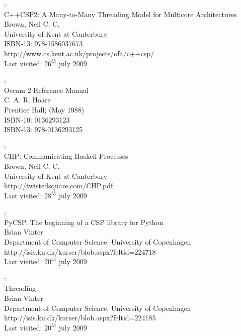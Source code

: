 \documentclass[a4paper,12pt]{article}
\begin{document}
\begin{thebibliography}{99}
:\\
C++CSP2: A Many-to-Many Threading Model for Multicore Architectures\\
Brown,  Neil C. C.\\
University of Kent at Canterbury\\
ISBN-13: 978-1586037673\\
http://www.cs.kent.ac.uk/projects/ofa/c++csp/\\
Last visited: $26^{th}$ july 2009

\newpage
{}
:\\
Occam 2 Reference Manual\\
C. A. R. Hoare\\
Prentice Hall; (May 1988)\\
ISBN-10: 0136293123\\
ISBN-13: 978-0136293125

:\\
CHP: Communicating Haskell Processes\\
Brown,  Neil C. C.\\
University of Kent at Canterbury\\
http://twistedsquare.com/CHP.pdf\\
Last visited: $28^{th}$ july 2009


:\\
PyCSP. The beginning of a CSP library for Python\\
Brian Vinter\\
Department of Computer Science. University of Copenhagen\\
http://isis.ku.dk/kurser/blob.aspx?feltid=224718\\
Last visited: $20^{th}$ july 2009

:\\
Threading\\
Brian Vinter\\
Department of Computer Science. University of Copenhagen\\
http://isis.ku.dk/kurser/blob.aspx?feltid=224185\\
Last visited: $20^{th}$ july 2009

\end{thebibliography}
\end{document}
